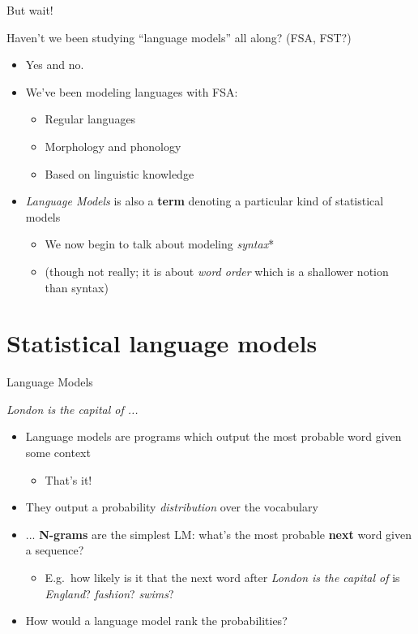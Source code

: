 \documentclass{beamer}
\begin{document}
\begin{frame}{But wait!}

  Haven't we been studying ``language models'' all along? (FSA, FST?)

  \begin{itemize}
  \item Yes and no.
  \item We've been modeling languages with FSA:
    \begin{itemize}
    \item Regular languages
    \item Morphology and phonology
    \item Based on linguistic knowledge
    \end{itemize}
  \item {\it Language Models} is also a {\bf term} denoting a particular kind of statistical models
    \begin{itemize}
    \item We now begin to talk about modeling {\it syntax}*
    \item (though not really; it is about {\it word order} which is a shallower notion than syntax)
    \end{itemize}
  \end{itemize}
\end{frame}

\section{Statistical language models}

\begin{frame}{Language Models}
  
  {\it London is the capital of ...}

  \vspace{0.5cm}

  \begin{itemize}
  \item Language models are programs which output the most probable word given some context
    \begin{itemize}
      \pause
    \item That's it!
    \end{itemize}
    \pause
  \item They output a probability {\it distribution} over the vocabulary
    \pause
  \item ... {\bf N-grams} are the simplest LM: what's the most probable {\bf next} word given a sequence?
    \begin{itemize}
    \item E.g.\ how likely is it that the next word after {\it London is the capital of} is {\it England}? {\it fashion}? {\it swims}?
    \end{itemize}
  \item How would a language model rank the probabilities? 
  \end{itemize}
\end{frame}
\end{document}
